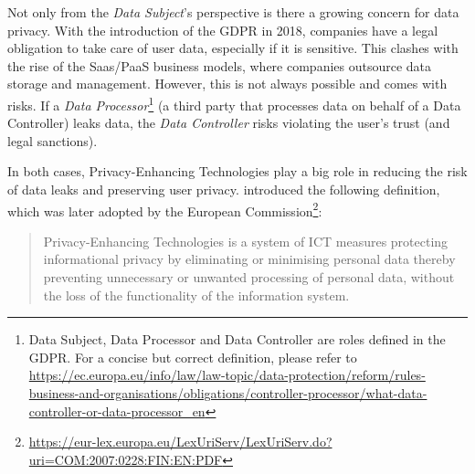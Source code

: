 Not only from the \textit{Data Subject}'s perspective is there a growing concern for data privacy. With the introduction of the \gls{GDPR} in 2018, companies have a legal obligation to take care of user data, especially if it is sensitive. This clashes with the rise of the Saas/PaaS business models, where companies outsource data storage and management. However, this is not always possible and comes with risks. If a \textit{Data Processor}\footnote{Data Subject, Data Processor and Data Controller are roles defined in the \gls{GDPR}. For a concise but correct definition, please refer to \url{https://ec.europa.eu/info/law/law-topic/data-protection/reform/rules-business-and-organisations/obligations/controller-processor/what-data-controller-or-data-processor_en}} (a third party that processes data on behalf of a Data Controller) leaks data, the \textit{Data Controller} risks violating the user's trust (and legal sanctions). 

In both cases, Privacy-Enhancing Technologies play a big role in reducing the risk of data leaks and preserving user privacy. \citeauthor{pets-handbook} introduced the following definition, which was later adopted by the European Commission\footnote{\url{https://eur-lex.europa.eu/LexUriServ/LexUriServ.do?uri=COM:2007:0228:FIN:EN:PDF}}:
\begin{quote}{\citeauthor{pets-handbook}}
    Privacy-Enhancing Technologies is a system of ICT measures protecting informational privacy by eliminating or minimising personal data thereby preventing unnecessary or unwanted processing of personal data, without the loss of the functionality of the information system.
\end{quote} 

